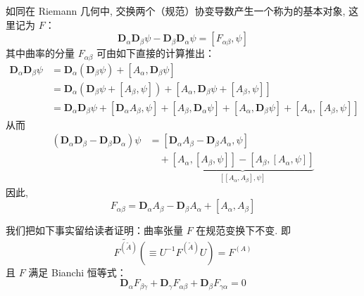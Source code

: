如同在 Riemann 几何中, 交换两个（规范）协变导数产生一个称为的基本对象, 这里记为 $F$：
\begin{equation}
\mathbf{D}_\alpha\mathbf{D}_\beta\psi - \mathbf{D}_\beta\mathbf{D}_\alpha\psi = [F_{\alpha\beta}, \psi]\label{eq:c1-49}
\end{equation}
其中曲率的分量 $F_{\alpha\beta}$ 可由如下直接的计算推出：
\[
\begin{aligned}
\mathbf{D}_\alpha\mathbf{D}_\beta\psi &= \mathbf{D}_\alpha(\mathbf{D}_\beta\psi) + [A_\alpha, \mathbf{D}_\beta\psi]\\
&= \mathbf{D}_\alpha(\mathbf{D}_\beta\psi + [A_\beta, \psi]) + [A_\alpha, \mathbf{D}_\beta\psi + [A_\beta, \psi]]\\
&= \mathbf{D}_\alpha\mathbf{D}_\beta\psi + [\mathbf{D}_\alpha A_\beta, \psi] + [A_\beta, \mathbf{D}_\alpha\psi] + [A_\alpha, \mathbf{D}_\beta\psi] + [A_\alpha, [A_\beta, \psi]]
\end{aligned}
\]
从而
\[
\begin{aligned}
(\mathbf{D}_\alpha\mathbf{D}_\beta - \mathbf{D}_\beta\mathbf{D}_\alpha)\psi &= [\mathbf{D}_\alpha A_\beta - \mathbf{D}_\beta A_\alpha, \psi]\\
&\quad + \underbrace{[A_\alpha, [A_\beta, \psi]] - [A_\beta, [A_\alpha, \psi]]}_{[[A_\alpha, A_\beta], \psi]}
\end{aligned}
\]
因此, 
\begin{equation}
F_{\alpha\beta} = \mathbf{D}_\alpha A_\beta - \mathbf{D}_\beta A_\alpha + [A_\alpha, A_\beta]\label{eq:c1-50}
\end{equation}

我们把如下事实留给读者证明：曲率张量 $F$ 在规范变换下不变. 即
\[
\widetilde{F^{(\tilde{A})}}\left(\equiv U^{-1}F^{(\tilde{A})}U\right) = F^{(A)}
\]
且 $F$ 满足 Bianchi 恒等式：
\begin{equation}
\mathbf{D}_\alpha F_{\beta\gamma} + \mathbf{D}_\gamma F_{\alpha\beta} + \mathbf{D}_\beta F_{\gamma\alpha} = 0\label{eq:c1-51}
\end{equation}

